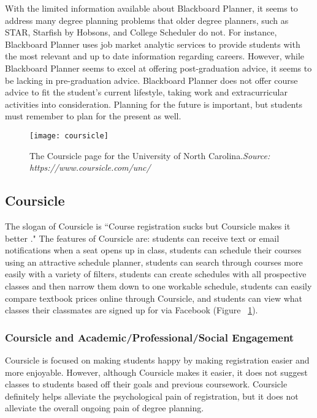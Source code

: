 With the limited information available about Blackboard Planner, it seems to address many degree planning problems that older degree planners, such as STAR, Starfish by Hobsons, and College Scheduler do not. For instance, Blackboard Planner uses job market analytic services to provide students with the most relevant and up to date information regarding careers. However, while Blackboard Planner seems to excel at offering post-graduation advice, it seems to be lacking in pre-graduation advice. Blackboard Planner does not offer course advice to fit the student's current lifestyle, taking work and extracurricular activities into consideration. Planning for the future is important, but students must remember to plan for the present as well. 

\begin{figure}[h]
\centering
\texttt{[image: coursicle]}
\caption{The Coursicle page for the University of North Carolina.\textit{Source: https://www.coursicle.com/unc/}}
\label{coursicle}
\end{figure}
\subsection{Coursicle}

The slogan of Coursicle is ``Course registration sucks but Coursicle makes it better  \cite{Coursicle}." The features of Coursicle are: students can receive text or email notifications when a seat opens up in class, students can schedule their courses using an attractive schedule planner, students can search through courses more easily with a variety of filters, students can create schedules with all prospective classes and then narrow them down to one workable schedule, students can easily compare textbook prices online through Coursicle, and students can view what classes their classmates are signed up for via Facebook (Figure ~\ref{coursicle}). 

\subsubsection{Coursicle and Academic/Professional/Social Engagement}

Coursicle is focused on making students happy by making registration easier and more enjoyable. However, although Coursicle makes it easier, it does not suggest classes to students based off their goals and previous coursework. Coursicle definitely helps alleviate the psychological pain of registration, but it does not alleviate the overall ongoing pain of degree planning. 

